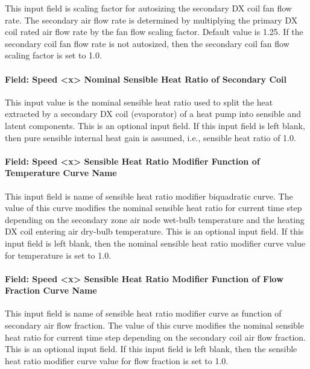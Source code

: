 This input field is scaling factor for autosizing the secondary DX coil fan flow rate. The secondary air flow rate is determined by multiplying the primary DX coil rated air flow rate by the fan flow scaling factor. Default value is 1.25. If the secondary coil fan flow rate is not autosized, then the secondary coil fan flow scaling factor is set to 1.0.

\paragraph{Field: Speed \textless{}x\textgreater{} Nominal Sensible Heat Ratio of Secondary Coil}\label{field-speed-x-nominal-sensible-heat-ratio-of-secondary-coil}

This input value is the nominal sensible heat ratio used to split the heat extracted by a secondary DX coil (evaporator) of a heat pump into sensible and latent components. This is an optional input field. If this input field is left blank, then pure sensible internal heat gain is assumed, i.e., sensible heat ratio of 1.0.

\paragraph{Field: Speed \textless{}x\textgreater{} Sensible Heat Ratio Modifier Function of Temperature Curve Name}\label{field-speed-x-sensible-heat-ratio-modifier-function-of-temperature-curve-name}

This input field is name of sensible heat ratio modifier biquadratic curve. The value of this curve modifies the nominal sensible heat ratio for current time step depending on the secondary zone air node wet-bulb temperature and the heating DX coil entering air dry-bulb temperature. This is an optional input field. If this input field is left blank, then the nominal sensible heat ratio modifier curve value for temperature is set to 1.0.

\paragraph{Field: Speed \textless{}x\textgreater{} Sensible Heat Ratio Modifier Function of Flow Fraction Curve Name}\label{field-speed-x-sensible-heat-ratio-modifier-function-of-flow-fraction-curve-name}

This input field is name of sensible heat ratio modifier curve as function of secondary air flow fraction. The value of this curve modifies the nominal sensible heat ratio for current time step depending on the secondary coil air flow fraction. This is an optional input field. If this input field is left blank, then the sensible heat ratio modifier curve value for flow fraction is set to 1.0.


